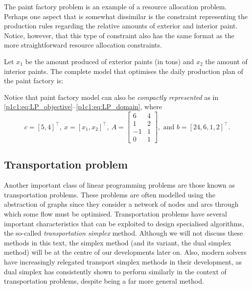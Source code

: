 The paint factory problem is an example of a resource allocation problem. Perhaps one aspect that is somewhat dissimilar is the constraint representing the production rules regarding the relative amounts of exterior and interior paint. Notice, however, that this type of constraint also has the same format as the more straightforward resource allocation constraints.  

Let $x_1$ be the amount produced of exterior paints (in tons) and $x_2$ the amount of interior paints. The complete model that optimises the daily production plan of the paint factory is:
%
%
Notice that paint factory model can also be \emph{compactly represented} as in \eqref{p1c1:eq:LP_objective}--\eqref{p1c1:eq:LP_domain}, where
%
\begin{equation*}
	c = [5, 4]^\top, \ x = [x_1, x_2]^\top, \ A = \begin{bmatrix} 6 & 4 \\ 1 & 2 \\ -1 & 1 \\0 & 1 \end{bmatrix}, \text{ and } b = [24, 6, 1, 2]^\top.	
\end{equation*}
%


\subsection{Transportation problem}

Another important class of linear programming problems are those known as transportation problems. These problems are often modelled using the abstraction of graphs since they consider a network of nodes and arcs through which some flow must be optimised. Transportation problems have several important characteristics that can be exploited to design specialised algorithms, the so-called \emph{transportation simplex} method. Although we will not discuss these methods in this text, the simplex method (and its variant, the dual simplex method) will be at the centre of our developments later on. Also, modern solvers have increasingly relegated transport simplex methods in their development, as dual simplex has consistently shown to perform similarly in the context of transportation problems, despite being a far more general method. 


